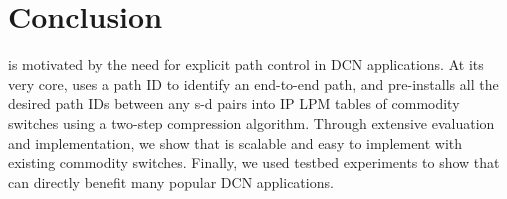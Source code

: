 \section{Conclusion}\label{sec:conclusion}

\sys is motivated by the need for explicit path control in DCN applications. At its very core, \sys uses a path ID to identify an end-to-end path, and pre-installs all the desired path IDs between any s-d pairs into IP LPM tables of commodity switches using a two-step compression algorithm. Through extensive evaluation and implementation, we show that \sys is scalable and easy to implement with existing commodity switches. Finally, we used testbed experiments to show that \sys can directly benefit many popular DCN applications.



